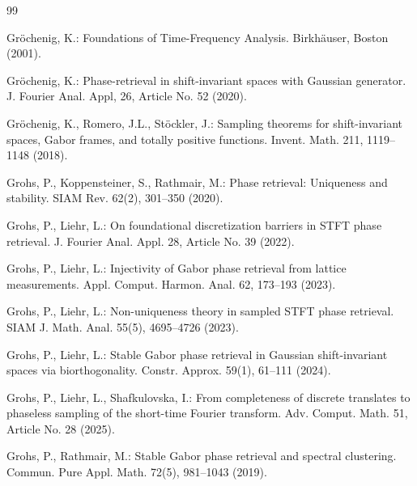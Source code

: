 \documentclass[11pt, reqno]{amsart}
\numberwithin{equation}{section}
\begin{document}
\begin{thebibliography}{99}

	Gr{\"o}chenig, K.: Foundations of Time-Frequency Analysis. Birkh{\"a}user, Boston (2001).

Gr{\"o}chenig, K.: Phase-retrieval in shift-invariant spaces with Gaussian generator. J. Fourier Anal. Appl, 26, Article No. 52 (2020). 

Gr{\"o}chenig, K., Romero, J.L., St{\"o}ckler, J.: Sampling theorems for shift-invariant spaces, Gabor frames, and totally positive functions. Invent. Math. 211, 1119--1148 (2018).

Grohs, P., Koppensteiner, S., Rathmair, M.: Phase retrieval: Uniqueness and stability. SIAM Rev. 62(2), 301--350 (2020).

Grohs, P., Liehr, L.: On foundational discretization barriers in STFT phase retrieval. J. Fourier Anal. Appl. 28, Article No. 39 (2022).

Grohs, P., Liehr, L.: Injectivity of Gabor phase retrieval from lattice measurements. Appl. Comput. Harmon. Anal. 62, 173--193 (2023).

Grohs, P., Liehr, L.: Non-uniqueness theory in sampled STFT phase retrieval. SIAM J. Math. Anal. 55(5), 4695--4726 (2023).



Grohs, P., Liehr, L.: Stable Gabor phase retrieval in Gaussian shift-invariant spaces via biorthogonality. Constr. Approx. 59(1), 61--111 (2024).



Grohs, P., Liehr, L., Shafkulovska, I.: From completeness of discrete translates to phaseless sampling of the short-time Fourier transform. Adv. Comput. Math. 51, Article No. 28 (2025).

Grohs, P., Rathmair, M.: Stable Gabor phase retrieval and spectral clustering. Commun. Pure Appl. Math. 72(5), 981--1043 (2019).


\end{thebibliography}
\end{document}
